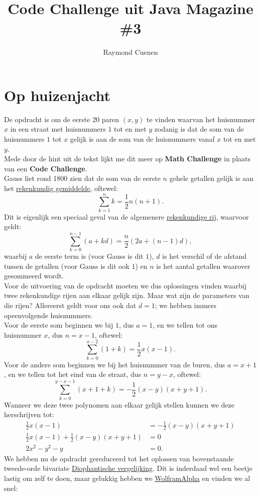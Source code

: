 \documentclass[11pt, a4paper]{article}
\begin{document}
\title{Code Challenge uit Java Magazine \#3}
\author{Raymond Cuenen}
\maketitle
\section*{Op huizenjacht}
De opdracht is om de eerste $20$ paren $(x, y)$ te vinden waarvan het huisnummer $x$ in een straat met huisnummers $1$ tot en met $y$ zodanig is dat de som van de huisnummers $1$ tot $x$ gelijk is aan de som van de huisnummers vanaf $x$ tot en met $y$.\\[11pt]
Mede door de hint uit de tekst lijkt me dit meer op \textbf{Math Challenge} in plaats van een \textbf{Code Challenge}.\\
Gauss liet rond 1800 zien dat de som van de eerste $n$ gehele getallen gelijk is aan het \href{http://nl.wikipedia.org/wiki/Rekenkundig_gemiddelde}{rekenkundig gemiddelde}, oftewel:
$$\sum_{k=1}^nk=\frac{1}{2}n(n+1).$$
Dit is eigenlijk een speciaal geval van de algemenere \href{http://nl.wikipedia.org/wiki/Rekenkundige_rij}{rekenkundige rij}, waarvoor geldt:
$$\sum_{k=0}^{n-1}(a+kd)=\frac{n}{2}(2a+(n-1)d),$$
waarbij $a$ de eerste term is (voor Gauss is dit $1$), $d$ is het verschil of de afstand tussen de getallen (voor Gauss is dit ook $1$) en $n$ is het aantal getallen waarover gesommeerd wordt.\\[11pt]
Voor de uitvoering van de opdracht moeten we dus oplossingen vinden waarbij twee rekenkundige rijen aan elkaar gelijk zijn. Maar wat zijn de parameters van die rijen? Allereerst geldt voor ons ook dat $d=1$; we hebben immers opeenvolgende huisnummers.\\
Voor de eerste som beginnen we bij $1$, dus $a=1$, en we tellen tot ons huisnummer $x$, dus $n=x-1$, oftewel:
$$\sum_{k=0}^{x-2}(1+k)=\frac{1}{2}x(x-1).$$
Voor de andere som beginnen we bij het huisnummer van de buren, dus $a=x+1$, en we tellen tot het eind van de straat, dus $n=y-x$, oftewel:
$$\sum_{k=0}^{y-x-1}(x+1+k)=-\frac{1}{2}(x-y)(x+y+1).$$
Wanneer we deze twee polynomen aan elkaar gelijk stellen kunnen we deze herschrijven tot:
$$\begin{array}{rl}
\frac{1}{2}x(x-1)&=-\frac{1}{2}(x-y)(x+y+1)\\
\frac{1}{2}x(x-1)+\frac{1}{2}(x-y)(x+y+1)&=0\\
2x^2-y^2-y&=0.
\end{array}$$
We hebben nu de opdracht gereduceerd tot het oplossen van bovenstaande tweede-orde bivariate \href{http://nl.wikipedia.org/wiki/Diophantische_vergelijking}{Diophantische vergelijking}. Dit is inderdaad wel een beetje lastig om zelf te doen, maar gelukkig hebben we \href{http://www.wolframalpha.com/share/clip?f=d41d8cd98f00b204e9800998ecf8427epoad5fkns7}{WolframAlpha} en vinden we al snel:
\end{document}

